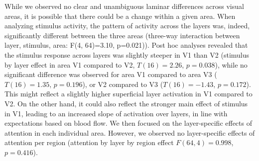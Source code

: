 \documentclass[9pt,lineno]{aperture}
\begin{document}
While we observed no clear and unambiguous laminar differences across visual areas, it is possible that there could be a change within a given area. When analyzing stimulus activity, the pattern of activity across the layers was, indeed, significantly different between the three areas (three-way interaction between layer, stimulus, area: F(4, 64)=3.10, p=0.021)). Post hoc analyses revealed that the stimulus response across layers was slightly steeper in V1 than V2 (stimulus by layer effect in area V1 compared to V2, $T(16)=2.26$, $p=0.038$), while no significant difference was observed for area V1 compared to area V3 ($T(16)=1.35$, $p=0.196$), or V2 compared to V3 ($T(16)=-1.43$, $p=0.172$). This might reflect a slightly higher superficial layer activation in V1 compared to V2. On the other hand, it could also reflect the stronger main effect of stimulus in V1, leading to an increased slope of activation over layers, in line with expectations based on blood flow. We then focused on the layer-specific effects of attention in each individual area.
However, we observed no layer-specific effects of attention per region (attention by layer by region effect $F(64,4)=0.998$, $p=0.416$).
\end{document}
